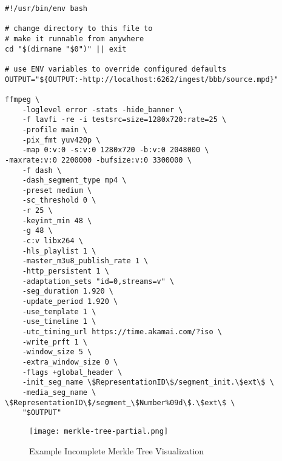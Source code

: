 
\begin{appendix}

\begin{minipage}{\linewidth}
\begin{lstlisting}[caption={Example FFmpeg Shell Script}, label=ex:shell, captionpos=b]
#!/usr/bin/env bash

# change directory to this file to  
# make it runnable from anywhere
cd "$(dirname "$0")" || exit
    
# use ENV variables to override configured defaults
OUTPUT="${OUTPUT:-http://localhost:6262/ingest/bbb/source.mpd}"
    
ffmpeg \
    -loglevel error -stats -hide_banner \
    -f lavfi -re -i testsrc=size=1280x720:rate=25 \
    -profile main \
    -pix_fmt yuv420p \
    -map 0:v:0 -s:v:0 1280x720 -b:v:0 2048000 \
-maxrate:v:0 2200000 -bufsize:v:0 3300000 \
    -f dash \
    -dash_segment_type mp4 \
    -preset medium \
    -sc_threshold 0 \
    -r 25 \
    -keyint_min 48 \
    -g 48 \
    -c:v libx264 \
    -hls_playlist 1 \
    -master_m3u8_publish_rate 1 \
    -http_persistent 1 \
    -adaptation_sets "id=0,streams=v" \
    -seg_duration 1.920 \
    -update_period 1.920 \
    -use_template 1 \
    -use_timeline 1 \
    -utc_timing_url https://time.akamai.com/?iso \
    -write_prft 1 \
    -window_size 5 \
    -extra_window_size 0 \
    -flags +global_header \
    -init_seg_name \$RepresentationID\$/segment_init.\$ext\$ \
    -media_seg_name \
\$RepresentationID\$/segment_\$Number%09d\$.\$ext\$ \
    "$OUTPUT"
\end{lstlisting}
\end{minipage}

\begin{figure}
    \texttt{[image: merkle-tree-partial.png]}
    \caption{Example Incomplete Merkle Tree Visualization}
    \label{fig:incomple_mt}
\end{figure}

\end{appendix}

\endinput
